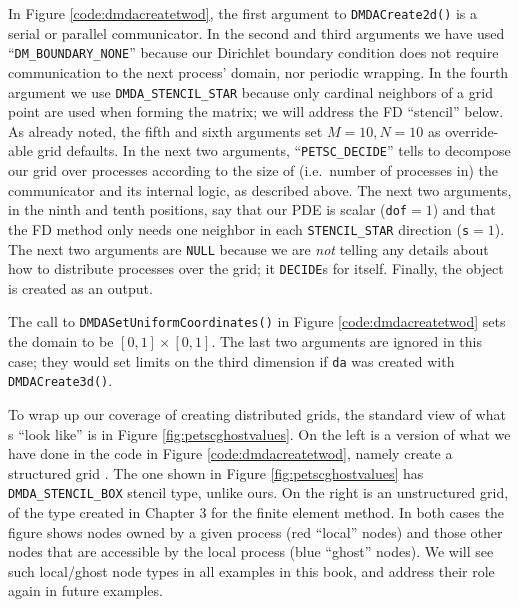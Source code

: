 \noindent In Figure \ref{code:dmdacreatetwod}, the first argument to \texttt{DMDACreate2d()} is a serial or parallel \MPI communicator.  In the second and third arguments we have used ``\texttt{DM\_BOUNDARY\_NONE}'' because our Dirichlet boundary condition does not require communication to the next process' domain, nor periodic wrapping.  In the fourth argument we use \texttt{DMDA\_STENCIL\_STAR} because only cardinal neighbors of a grid point are used when forming the matrix; we will address the FD ``stencil'' below.  As already noted, the fifth and sixth arguments set $M=10,N=10$ as override-able grid defaults.  In the next two arguments, ``\texttt{PETSC\_DECIDE}'' tells \PETSc to decompose our grid over \MPI processes according to the size of (i.e.~number of processes in) the \MPI communicator and its internal logic, as described above.  The next two arguments, in the ninth and tenth positions, say that our PDE is scalar (\texttt{dof}$=1$) and that the FD method only needs one neighbor in each \texttt{STENCIL\_STAR} direction (\texttt{s}$=1$).  The next two arguments are \texttt{NULL} because we are \emph{not} telling \PETSc any details about how to distribute processes over the grid; it \texttt{DECIDE}s for itself.  Finally, the \pDMDA object is created as an output.

The call to \texttt{DMDASetUniformCoordinates()} in Figure \ref{code:dmdacreatetwod} sets the domain to be $[0,1]\times[0,1]$.  The last two arguments are ignored in this case; they would set limits on the third dimension if \texttt{da} was created with \texttt{DMDACreate3d()}.

To wrap up our coverage of creating distributed grids, the standard \PETSc view of what \pDM s ``look like'' is in Figure \ref{fig:petscghostvalues}.  On the left is a version of what we have done in the code in Figure \ref{code:dmdacreatetwod}, namely create a structured grid \pDM.  The one shown in Figure \ref{fig:petscghostvalues} has \texttt{DMDA\_STENCIL\_BOX} stencil type, unlike ours.  On the right is an unstructured grid, of the type created in Chapter 3 for the finite element method.  In both cases the figure shows nodes owned by a given process (red ``local'' nodes) and those other nodes that are accessible by the local process (blue ``ghost'' nodes).  We will see such local/ghost node types in all examples in this book, and address their role again in future examples.

